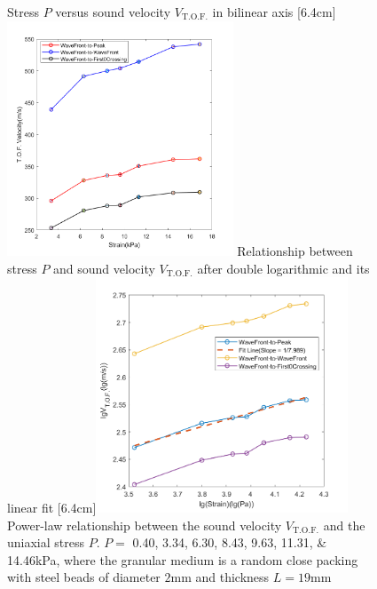 \begin{figure}[!hbtp]
  \centering
                  {Stress $P$ versus sound velocity $V_{\text{T.O.F.}}$ in bilinear axis}%
                  [6.4cm]{\includegraphics[height=7cm]{figures/2_strain_vs_velocity_20mm_1.png}}
  \hspace{1cm}
                  {Relationship between stress $P$ and sound velocity $V_{\text{T.O.F.}}$ after double logarithmic  and its linear fit}%
                  [6.4cm]{\includegraphics[height=7cm]{figures/2_strain_vs_velocity_20mm_2.png}}
                  {Power-law relationship between the sound velocity $V_{\text{T.O.F.}}$ and the uniaxial stress $P$. $P =$ \numlist[
                    list-final-separator = { and }
                  ]{0.40;3.34;6.30;8.43;9.63;11.31;14.46}\unit{\kilo\pascal}, where the granular medium is a random close packing with steel beads of diameter $2\unit{\milli\meter}$ and thickness $L = 19$\unit{\milli\meter}}
  \label{fig:normalized_width_versus_L}
\end{figure}


